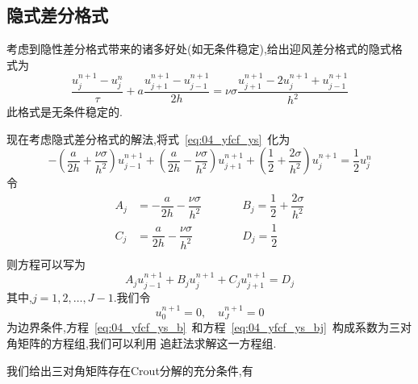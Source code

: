 \subsection{隐式差分格式}
考虑到隐性差分格式带来的诸多好处(如无条件稳定),给出迎风差分格式的隐式格式为
\begin{equation}\label{eq:04_yfcf_ys}
 \dfrac{u_j^{n+1}-u_j^n}{\tau}+a\dfrac{u_{j+1}^{n+1}-u_{j-1}^{n+1}}{2h}=\nu\sigma\dfrac{u_{j+1}^{n+1}
 -2u_j^{n+1}+u_{j-1}^{n+1}}{h^2}
\end{equation}
此格式是无条件稳定的.\par
现在考虑隐式差分格式的解法,将式~\eqref{eq:04_yfcf_ys}~化为
\begin{equation*}
-\left(\dfrac{a}{2h}+\dfrac{\nu\sigma}{h^2}\right)u_{j-1}^{n+1}+\left(\dfrac{a}{2h}-\dfrac{\nu\sigma}{h^2}\right)u_{j+1}^{n+1}
+\left(\dfrac{1}{2}+\dfrac{2\sigma}{h^2}\right)u_j^{n+1}=\dfrac{1}{2}u_j^n
\end{equation*}
令
\begin{equation*}
\begin{aligned}
A_j &= -\dfrac{a}{2h}-\dfrac{\nu\sigma}{h^2} & \qquad & B_j = \dfrac{1}{2}+\dfrac{2\sigma}{h^2} \\[0.6em]
C_j &= \dfrac{a}{2h}-\dfrac{\nu\sigma}{h^2}  &  \qquad & D_j = \dfrac{1}{2}   \\
\end{aligned}
\end{equation*}
则方程可以写为
\begin{equation}\label{eq:04_yfcf_ys_b}
 A_j u_{j-1}^{n+1} + B_j u_j^{n+1} + C_j u_{j+1}^{n+1} = D_j
\end{equation}
其中,$j=1,2,\ldots,J-1$.我们令
\begin{equation}\label{eq:04_yfcf_ys_bj}
 u_0^{n+1}=0,\quad u_J^{n+1}=0
\end{equation}
为边界条件,方程~\eqref{eq:04_yfcf_ys_b}~和方程~\eqref{eq:04_yfcf_ys_bj}~构成系数为三对角矩阵的方程组,我们可以利用
追赶法求解这一方程组.\par
我们给出三对角矩阵存在Crout分解的充分条件,有
